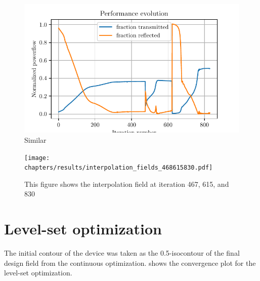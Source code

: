 \begin{figure}[htpb]
	\centering
	\includegraphics{chapters/results/conv_31.pdf}
	\caption{Similar}
	\label{fig:cont_conv1}
\end{figure}

\begin{figure}[htpb]
	\centering
	\texttt{[image: chapters/results/interpolation\_fields\_468615830.pdf]}
	\caption{This figure shows the interpolation field at iteration 467, 615,
		and 830%
	}
	\label{fig:cont_design1}
\end{figure}

\section{Level-set optimization}\label{sec:res_bin}

The initial contour of the device was taken as the 0.5-isocontour of the final
design field from the continuous optimization.
 shows the convergence plot for the level-set optimization.


\begin{figure}[htpb]
	\centering
	\caption{}
	\label{fig:bin_design}
\end{figure}

\begin{figure}[htpb]
	\centering
	\caption{}
	\label{fig:bin_conv}
\end{figure}
